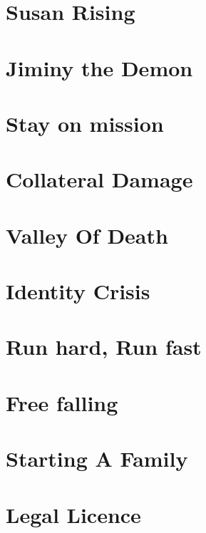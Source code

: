 \chapter{Susan Rising}

\chapter{Jiminy the Demon}

\chapter{Stay on mission}

\chapter{Collateral Damage}

\chapter{Valley Of Death}

\chapter{Identity Crisis}

\chapter{Run hard, Run fast}

\chapter{Free falling}

\chapter{Starting A Family}

\chapter{Legal Licence}

